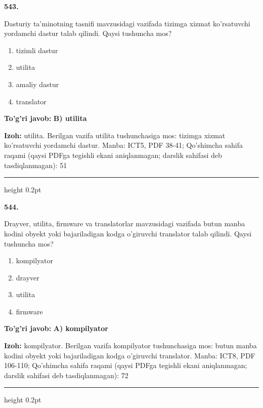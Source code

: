\documentclass[10pt,a4paper]{article}
\begin{document}
{\bfseries\sffamily\color{ink} 543.}
\par
Dasturiy ta'minotning tasnifi mavzusidagi vazifada tizimga xizmat ko'rsatuvchi yordamchi dastur talab qilindi. Qaysi tushuncha mos?
\begin{enumerate}[label=\Alph*),leftmargin=9mm]
\item tizimli dastur
\item utilita
\item amaliy dastur
\item translator
\end{enumerate}
\begin{tcolorbox}[enhanced,breakable,colback=teal!4,colframe=teal!60!black,boxrule=0.45pt,arc=1.2mm,left=2.7mm,right=2.7mm,top=1.8mm,bottom=1.8mm,before skip=2mm,after skip=2mm]
{\bfseries\sffamily\color{teal}To'g'ri javob:} \textbf{B) utilita}
\par\smallskip
{\bfseries Izoh:} utilita. Berilgan vazifa utilita tushunchasiga mos: tizimga xizmat ko'rsatuvchi yordamchi dastur. Manba: ICT5, PDF 38-41; Qo'shimcha sahifa raqami (qaysi PDFga tegishli ekani aniqlanmagan; darslik sahifasi deb tasdiqlanmagan): 51
\end{tcolorbox}
\vspace{2mm}\hrule height 0.2pt\vspace{3mm}

{\bfseries\sffamily\color{ink} 544.}
\par
Drayver, utilita, firmware va translatorlar mavzusidagi vazifada butun manba kodini obyekt yoki bajariladigan kodga o'giruvchi translator talab qilindi. Qaysi tushuncha mos?
\begin{enumerate}[label=\Alph*),leftmargin=9mm]
\item kompilyator
\item drayver
\item utilita
\item firmware
\end{enumerate}
\begin{tcolorbox}[enhanced,breakable,colback=teal!4,colframe=teal!60!black,boxrule=0.45pt,arc=1.2mm,left=2.7mm,right=2.7mm,top=1.8mm,bottom=1.8mm,before skip=2mm,after skip=2mm]
{\bfseries\sffamily\color{teal}To'g'ri javob:} \textbf{A) kompilyator}
\par\smallskip
{\bfseries Izoh:} kompilyator. Berilgan vazifa kompilyator tushunchasiga mos: butun manba kodini obyekt yoki bajariladigan kodga o'giruvchi translator. Manba: ICT8, PDF 106-110; Qo'shimcha sahifa raqami (qaysi PDFga tegishli ekani aniqlanmagan; darslik sahifasi deb tasdiqlanmagan): 72
\end{tcolorbox}
\vspace{2mm}\hrule height 0.2pt\vspace{3mm}
\end{document}
